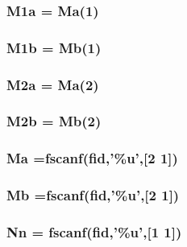 \subsubsection[{M1a}]{\setlength{\rightskip}{0pt plus 5cm}M1a = {\bf Ma}(1)}\label{plotting_8m_aee5f364531d0e3bf2eae09cd4d249436}
\subsubsection[{M1b}]{\setlength{\rightskip}{0pt plus 5cm}M1b = {\bf Mb}(1)}\label{plotting_8m_aa28add0b26269b1257191bf0a7d92bf7}
\subsubsection[{M2a}]{\setlength{\rightskip}{0pt plus 5cm}M2a = {\bf Ma}(2)}\label{plotting_8m_a023a6500888dfce7a2b2f9829da69412}
\subsubsection[{M2b}]{\setlength{\rightskip}{0pt plus 5cm}M2b = {\bf Mb}(2)}\label{plotting_8m_ad7cb08aaa48551c8403348d49c5a6bce}
\subsubsection[{Ma}]{\setlength{\rightskip}{0pt plus 5cm}Ma ={\bf fscanf}({\bf fid},'\%u',[2 1])}\label{plotting_8m_a18c4e1bb1cc893fbf8b653ed4adbc9b8}
\subsubsection[{Mb}]{\setlength{\rightskip}{0pt plus 5cm}Mb ={\bf fscanf}({\bf fid},'\%u',[2 1])}\label{plotting_8m_ae02f8dace6c28950c483bf853ea603c3}
\subsubsection[{Nn}]{\setlength{\rightskip}{0pt plus 5cm}Nn = {\bf fscanf}({\bf fid},'\%u',[1 1])}\label{plotting_8m_a8a49678f036ecb35c79f913d252d7a77}


